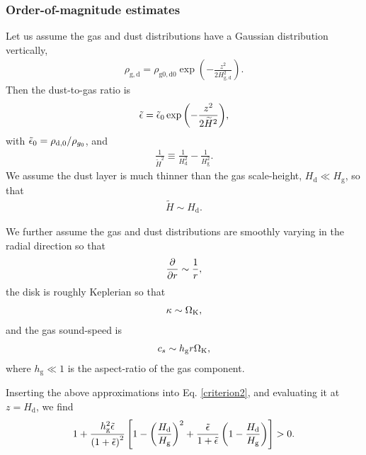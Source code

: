 \subsubsection{Order-of-magnitude estimates}
Let us assume the gas and dust distributions have a Gaussian
distribution vertically,
\begin{align}
  \rho_\mathrm{g,d} = \rho_\mathrm{g0,d0} \exp
      {\left(-\frac{z^2}{2H^2_\mathrm{g,d}}\right)}.
\end{align}
Then the dust-to-gas ratio is 
\begin{align}
  \tilde{\epsilon} = \tilde{\epsilon}_0
  \exp{\left(-\frac{z^2}{2\widetilde{H}^2}\right)}, 
\end{align}
with $\tilde{\epsilon}_0= \rho_\mathrm{d,0}/\rho_{g_0}$, and  
\begin{align}
  \frac{1}{\widetilde{H}^2} \equiv \frac{1}{H_\mathrm{d}^2} -
  \frac{1}{H_\mathrm{g}^2}. 
\end{align}
We assume the dust layer is much thinner than the gas scale-height,
$H_\mathrm{d}\ll H_\mathrm{g}$, so that 
\begin{align}
 \widetilde{H} \sim H_\mathrm{d}. 
\end{align} 

We further assume the gas and dust
distributions are smoothly varying in the radial direction so that  
\begin{align}
  \frac{\partial}{\partial r}\sim \frac{1}{r}, 
\end{align}
the disk is roughly Keplerian so that
\begin{align}
  \kappa \sim \Omega_{\rm K}, 
\end{align}
and the gas sound-speed is 
\begin{align}
  c_s \sim h_\mathrm{g}r\Omega_{\rm K}, 
\end{align}
where $h_\mathrm{g}\ll1$ is the aspect-ratio of the gas component. 

Inserting the above approximations into Eq. \ref{criterion2}, and
evaluating it at $z = H_\mathrm{d}$, we find 
\begin{align}
1 + \frac{h_\mathrm{g}^2\tilde{\epsilon}}{\left(1 + \tilde{\epsilon}\right)^2}
\left[1 - \left(\frac{H_\mathrm{d}}{H_\mathrm{g}}\right)^2 +
  \frac{\tilde{\epsilon}}{1+\tilde{\epsilon}}\left(1 -
  \frac{H_\mathrm{d}}{H_\mathrm{g}}\right)   
\right]>0.
\end{align}




